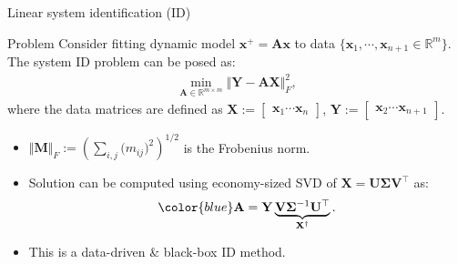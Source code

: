 \documentclass[10pt]{beamer}
\newcommand{\blue}{\color{blue}}
\newcommand{\bx}{\mathbf{x}}
\newcommand{\bX}{\mathbf{X}}
\newcommand{\bY}{\mathbf{Y}}
\newcommand{\bA}{\mathbf{A}}
\newcommand{\bS}{\mathbf{\Sigma}}
\newcommand{\bU}{\mathbf{U}}
\newcommand{\bV}{\mathbf{V}}
\begin{document}
\begin{frame}{Linear system identification (ID)}
    \begin{block}{Problem}
      Consider fitting dynamic model $\bx^+ = \bA\bx$ to data $\{\bx_1,\cdots,\bx_{n+1}\in\mathbb{R}^m\}$. The system ID problem can be posed as:
      \begin{align*}
      \min_{\bA\in\mathbb{R}^{m\times m}} \Vert \bY - \bA \bX \Vert_F^2,
      \end{align*}
      where the data matrices are defined as $\bX :=
      \begin{bmatrix}
        \bx_1 \cdots \bx_n
      \end{bmatrix}$, $
      \bY :=
      \begin{bmatrix}
        \bx_2 \cdots \bx_{n+1}
      \end{bmatrix}$.
    \end{block}
    \begin{itemize}
    \item $\Vert\mathbf{M}\Vert_F:=\left(\sum_{i,j}{(m_{ij}})^2 \right)^{1/2}$ is the Frobenius norm.
      \vspace{0.1in}
    \item Solution can be computed using economy-sized SVD of $\bX=\bU\bS\bV^\top$ as:
      \begin{align*}
        \blue \bA= \bY\underbrace{\bV \bS^{-1} \bU^\top}_{\bX^\dag}.
      \end{align*}
    \item This is a data-driven \& black-box ID method.
    \end{itemize}
\end{frame}
\end{document}
